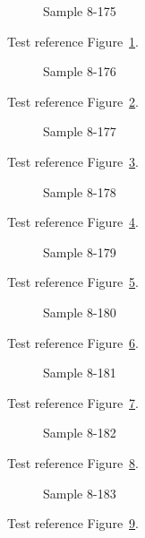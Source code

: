 \begin{figure}[tbhp]
\caption{Sample 8-175}
\label{fig:sample-8-175}
\end{figure}

Test reference Figure~\ref{fig:sample-8-175}.

\begin{figure}[tbhp]
\caption{Sample 8-176}
\label{fig:sample-8-176}
\end{figure}

Test reference Figure~\ref{fig:sample-8-176}.

\begin{figure}[tbhp]
\caption{Sample 8-177}
\label{fig:sample-8-177}
\end{figure}

Test reference Figure~\ref{fig:sample-8-177}.

\begin{figure}[tbhp]
\caption{Sample 8-178}
\label{fig:sample-8-178}
\end{figure}

Test reference Figure~\ref{fig:sample-8-178}.

\begin{figure}[tbhp]
\caption{Sample 8-179}
\label{fig:sample-8-179}
\end{figure}

Test reference Figure~\ref{fig:sample-8-179}.

\begin{figure}[tbhp]
\caption{Sample 8-180}
\label{fig:sample-8-180}
\end{figure}

Test reference Figure~\ref{fig:sample-8-180}.

\begin{figure}[tbhp]
\caption{Sample 8-181}
\label{fig:sample-8-181}
\end{figure}

Test reference Figure~\ref{fig:sample-8-181}.

\begin{figure}[tbhp]
\caption{Sample 8-182}
\label{fig:sample-8-182}
\end{figure}

Test reference Figure~\ref{fig:sample-8-182}.

\begin{figure}[tbhp]
\caption{Sample 8-183}
\label{fig:sample-8-183}
\end{figure}

Test reference Figure~\ref{fig:sample-8-183}.

